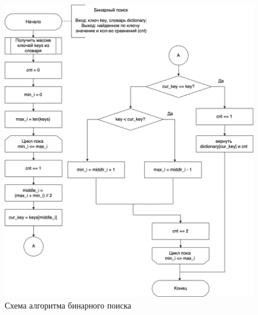 \documentclass[a4paper,14pt, unknownkeysallowed]{extreport}
\begin{document}
\begin{figure}[h]
	\centering
	\includegraphics[scale=0.54]{report_files/binary_search_scheme.png}
	\caption{Схема алгоритма бинарного поиска}
	\label{fig:binary_search}
\end{figure}

\clearpage
\end{document}
